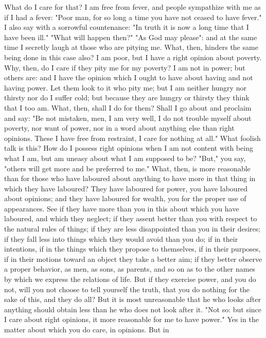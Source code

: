 \documentclass[a4paper]{article}
\begin{document}
What do I care for that? I am free from fever, and people sympathize with me as
if I had a fever: "Poor man, for so long a time you have not ceased to have
fever." I also say with a sorrowful countenance: "In truth it is now a long
time that I have been ill." "What will happen then?" "As God may please": and
at the same time I secretly laugh at those who are pitying me. What, then,
hinders the same being done in this case also? I am poor, but I have a right
opinion about poverty. Why, then, do I care if they pity me for my poverty? I
am not in power; but others are: and I have the opinion which I ought to have
about having and not having power. Let them look to it who pity me; but I am
neither hungry nor thirsty nor do I suffer cold; but because they are hungry or
thirsty they think that I too am. What, then, shall I do for them? Shall I go
about and proclaim and say: "Be not mistaken, men, I am very well, I do not
trouble myself about poverty, nor want of power, nor in a word about anything
else than right opinions. These I have free from restraint, I care for nothing
at all." What foolish talk is this? How do I possess right opinions when I am
not content with being what I am, but am uneasy about what I am supposed to be?
    "But," you say, "others will get more and be preferred to me." What, then,
is more reasonable than for those who have laboured about anything to have more
in that thing in which they have laboured? They have laboured for power, you
have laboured about opinions; and they have laboured for wealth, you for the
proper use of appearances. See if they have more than you in this about which
you have laboured, and which they neglect; if they assent better than you with
respect to the natural rules of things; if they are less disappointed than you
in their desires; if they fall less into things which they would avoid than you
do; if in their intentions, if in the things which they propose to themselves,
if in their purposes, if in their motions toward an object they take a better
aim; if they better observe a proper behavior, as men, as sons, as parents, and
so on as to the other names by which we express the relations of life. But if
they exercise power, and you do not, will you not choose to tell yourself the
truth, that you do nothing for the sake of this, and they do all? But it is
most unreasonable that he who looks after anything should obtain less than he
who does not look after it.
    "Not so: but since I care about right opinions, it more reasonable for me
to have power." Yes in the matter about which you do care, in opinions. But in
\end{document}
